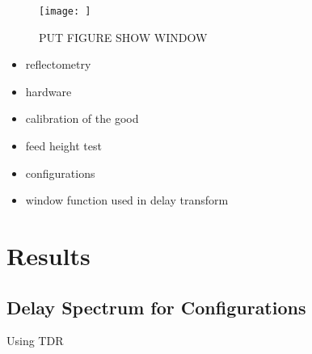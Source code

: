 \documentclass[preprint]{aastex}  %
\begin{document}
\begin{figure}[H]
	\begin{center}
	\texttt{[image: ]}
	\caption{PUT FIGURE SHOW WINDOW 
\label{Fig:} }
	\end{center}
\end{figure}


\begin{itemize}
\item reflectometry 
\item hardware 
\item calibration of the good
\item feed height test
\item configurations
\item window function used in delay transform
\end{itemize}

\section{Results}
\label{sec:results}
\subsection{Delay Spectrum for Configurations}
Using TDR 
\end{document}
